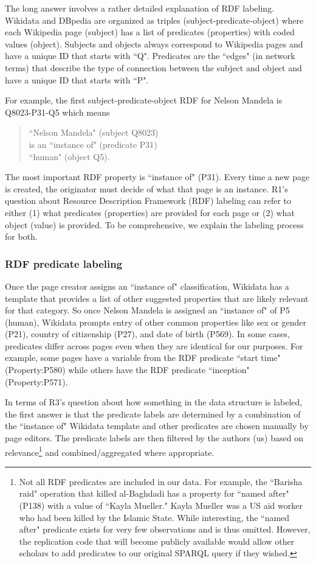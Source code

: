 \documentclass[fleqn,12pt]{article}
\begin{document}
The long answer involves a rather detailed explanation of RDF labeling. Wikidata and DBpedia are organized as triples (subject-predicate-object) where each Wikipedia page (subject) has a list of predicates (properties) with coded values (object). Subjects and objects always correspond to Wikipedia pages and have a unique ID that starts with ``Q". Predicates are the ``edges" (in network terms) that describe the type of connection between the subject and object and have a unique ID that starts with ``P".

For example, the first subject-predicate-object RDF for Nelson Mandela is Q8023-P31-Q5 which means 

\begin{quote}
    ``Nelson Mandela" (subject Q8023) \\
    is an ``instance of" (predicate P31) \\
    ``human" (object Q5). 
\end{quote}

The most important RDF property is ``instance of" (P31). Every time a new page is created, the originator must decide of what that page is an instance. R1's question about Resource Description Framework (RDF) labeling can refer to either (1) what predicates (properties) are provided for each page or (2) what object (value) is provided. To be comprehensive, we explain the labeling process for both.

\subsubsection*{RDF predicate labeling}
Once the page creator assigns an ``instance of" classification, Wikidata has a template that provides a list of other suggested properties that are likely relevant for that category. So once Nelson Mandela is assigned an ``instance of" of P5 (human), Wikidata prompts entry of other common properties like sex or gender (P21), country of citizenship (P27), and date of birth (P569). In some cases, predicates differ across pages even when they are identical for our purposes. For example, some pages have a variable from the RDF predicate ``start time" (Property:P580) while others have the RDF predicate ``inception" (Property:P571).

In terms of R3's question about how something in the data structure is labeled, the first answer is that the predicate labels are determined by a combination of the ``instance of" Wikidata template and other predicates are chosen manually by page editors. The predicate labels are then filtered by the authors (us) based on relevance\footnote{Not all RDF predicates are included in our data. For example, the ``Barisha raid" operation that killed al-Baghdadi has a property for ``named after" (P138) with a value of ``Kayla Mueller." Kayla Mueller was a US aid worker who had been killed by the Islamic State. While interesting, the ``named after" predicate exists for very few observations and is thus omitted. However, the replication code that will become publicly available would allow other scholars to add predicates to our original SPARQL query if they wished.} and combined/aggregated where appropriate.
\end{document}
